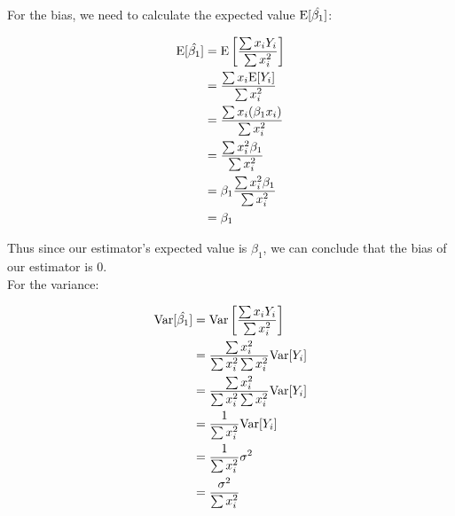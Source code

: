 \begin{homeworkProblem}
	\solution
	
	For the bias, we need to calculate the expected value
	\(\mathrm{E}[\hat{\beta_1}]\):
	
	\[
	\begin{split}
		\mathrm{E}[\hat{\beta_1}]
		&= \mathrm{E} \left[ \frac{
			\sum {x_i Y_i}
		}{
			\sum x_i^2
		}\right]
		\\
		&= \frac{
			\sum {x_i \mathrm{E}[Y_i]}
		}{
			\sum x_i^2
		}
		\\
		&= \frac{
			\sum {x_i (\beta_1 x_i)}
		}{
			\sum x_i^2
		}
		\\
		&= \frac{
			\sum {x_i^2 \beta_1}
		}{
			\sum x_i^2
		}
		\\
		&= \beta_1 \frac{
			\sum {x_i^2 \beta_1}
		}{
			\sum x_i^2
		}
		\\
		&= \beta_1
	\end{split}
	\]
	
	Thus since our estimator's expected value is \(\beta_1\), we can conclude
	that the bias of our estimator is 0.
	\\
	
	For the variance:
	
	\[
	\begin{split}
		\mathrm{Var}[\hat{\beta_1}]
		&= \mathrm{Var} \left[ \frac{
			\sum {x_i Y_i}
		}{
			\sum x_i^2
		}\right]
		\\
		&=
		\frac{
			\sum {x_i^2}
		}{
			\sum x_i^2 \sum x_i^2
		} \mathrm{Var}[Y_i]
		\\
		&=
		\frac{
			\sum {x_i^2}
		}{
			\sum x_i^2 \sum x_i^2
		} \mathrm{Var}[Y_i]
		\\
		&=
		\frac{
			1
		}{
			\sum x_i^2
		} \mathrm{Var}[Y_i]
		\\
		&=
		\frac{
			1
		}{
			\sum x_i^2
		} \sigma^2
		\\
		&=
		\frac{
			\sigma^2
		}{
			\sum x_i^2
		}
	\end{split}
	\]
	
\end{homeworkProblem}

\pagebreak


